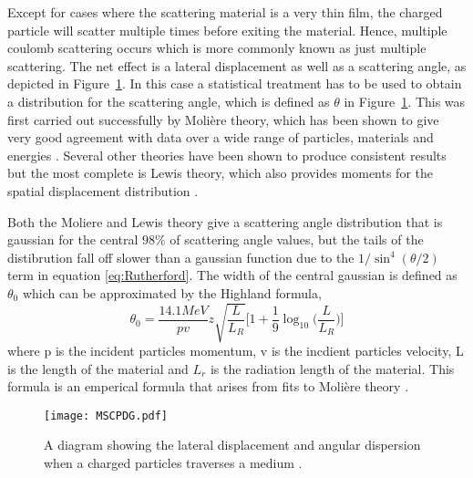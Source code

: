 Except for cases where the scattering material is a very thin film, the charged particle will scatter multiple times before exiting the material.  Hence, multiple coulomb scattering occurs which is more commonly known as just multiple scattering. The net effect is a lateral displacement as well as a scattering angle, as depicted in Figure~\ref{fig:MSCPDG}.  In this case a statistical treatment has to be used to obtain a distribution for the scattering angle, which is defined as $\theta$ in Figure~\ref{fig:MSCPDG}. This was first carried out successfully by Moli\`{e}re theory, which has been shown to give very good agreement with data over a wide range of particles, materials and energies \cite{PhysRev.89.1256,Gottschalk1993467}.  Several other theories have been shown to produce consistent results but the most complete is Lewis theory, which also provides moments for the spatial displacement distribution \cite{PhysRev.78.526}.

Both the Moliere and Lewis theory give a scattering angle distribution that is gaussian for the central $98\%$ of scattering angle values, but the tails of the distibrution fall off slower than a gaussian function due to the $1/\sin^4(\theta/2)$ term in equation \ref{eq:Rutherford}.  The width of the central gaussian is defined as $\theta_0$ which can be approximated by the Highland formula,
\begin{equation}
  \label{eq:Highland}
  \theta_0=\frac{14.1MeV}{pv}z\sqrt{\frac{L}{L_R}}\big[1+\frac{1}{9}\log_{10}\big(\frac{L}{L_R}\big)\big]
\end{equation}
where p is the incident particles momentum, v is the incdient particles velocity, L is the length of the material and $L_r$ is the radiation length of the material.  This formula is an emperical formula that arises from fits to Moli\`{e}re theory \cite{Highland1975497}.

\begin{figure}[h]
  \centering
  \texttt{[image: MSCPDG.pdf]}
  \caption{A diagram showing the lateral displacement and angular dispersion when a charged particles traverses a medium \cite{PDG2014}.}
  \label{fig:MSCPDG}
\end{figure}

